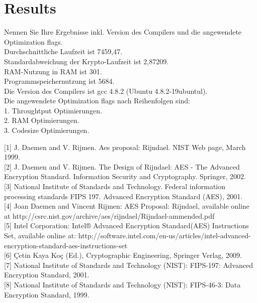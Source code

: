\documentclass[abstract,bibliography=totocnumbered,listof=leveldown,open=any,titlepage]{scrreprt}
\begin{document}
		\section{Results}
		
		Nennen Sie Ihre Ergebnisse inkl. Version des Compilers und die angewendete Optimization flags.\vspace{3mm}  \\
		Durchschnittliche Laufzeit ist 7459,47.\\
		Standardabweichung der Krypto-Laufzeit ist 2,87209.\\
		RAM-Nutzung in RAM ist 301.\\
		Programmspeichernutzung ist 5684.\vspace{1mm}\\
		Die Version des Compilers ist gcc 4.8.2 (Ubuntu 4.8.2-19ubuntul).\vspace{1mm}\\
		Die angewendete Optimization flags nach Reihenfolgen sind:\\
		1. Throughtput Optimierungen.\\
		2. RAM Optimierungen.\\
		3. Codesize Optimierungen.
	
	{[1]} J. Daemen and V. Rijmen. Aes proposal: Rijndael. NIST Web page, March 1999.\\
	{[2]} J. Daemen and V. Rijmen. The Design of Rijndael: AES - The Advanced Encryption Standard. Information Security and Cryptography. Springer, 2002.\\
	{[3]} National Institute of Standards and Technology. Federal information processing standards FIPS 197. Advanced Encryption Standard (AES), 2001.\\
	{[4]} Joan Daemen and Vincent Rijmen: AES Proposal: Rijndael, available online at http://csrc.nist.gov/archive/aes/rijndael/Rijndael-ammended.pdf\\
	{[5]} Intel Corporation: Intel® Advanced Encryption Standard(AES) Instructions Set, available online at: http://software.intel.com/en-us/articles/intel-advanced-encryption-standard-aes-instructions-set\\
	{[6]} Çetin Kaya Koç (Ed.), Cryptographic Engineering, Springer Verlag, 2009.\\
	{[7]} National Institute of Standards and Technology (NIST): FIPS-197: Advanced Encryption Standard, 2001.\\
	{[8]} National Institute of Standards and Technology (NIST): FIPS-46-3: Data Encryption Standard, 1999.\\
	
	
\end{document}
